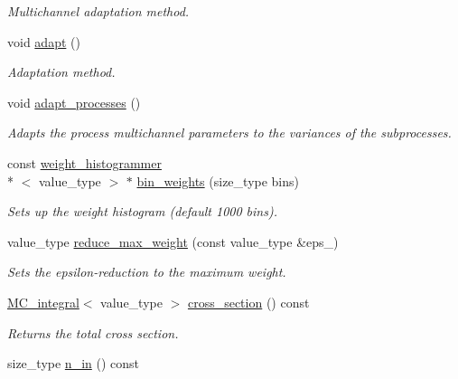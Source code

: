 \begin{DoxyCompactItemize}
\begin{DoxyCompactList}\small\item\em Multichannel adaptation method. \end{DoxyCompactList}\item 
\hypertarget{a00210_a47b3c2a1dd77d0f6537bf973e82ccab6}{void \hyperlink{a00210_a47b3c2a1dd77d0f6537bf973e82ccab6}{adapt} ()}\label{a00210_a47b3c2a1dd77d0f6537bf973e82ccab6}

\begin{DoxyCompactList}\small\item\em Adaptation method. \end{DoxyCompactList}\item 
void \hyperlink{a00210_addbfc929e753761773ff755ed3fff5dc}{adapt\-\_\-processes} ()
\begin{DoxyCompactList}\small\item\em Adapts the process multichannel parameters to the variances of the subprocesses. \end{DoxyCompactList}\item 
\hypertarget{a00210_a8138a6a1c736c588f0b4298e7f118719}{const \hyperlink{a00576}{weight\-\_\-histogrammer}\\*
$<$ value\-\_\-type $>$ $\ast$ \hyperlink{a00210_a8138a6a1c736c588f0b4298e7f118719}{bin\-\_\-weights} (size\-\_\-type bins)}\label{a00210_a8138a6a1c736c588f0b4298e7f118719}

\begin{DoxyCompactList}\small\item\em Sets up the weight histogram (default 1000 bins). \end{DoxyCompactList}\item 
\hypertarget{a00210_a27e2b6a812ca5eee12c60a67a5718020}{value\-\_\-type \hyperlink{a00210_a27e2b6a812ca5eee12c60a67a5718020}{reduce\-\_\-max\-\_\-weight} (const value\-\_\-type \&eps\-\_\-)}\label{a00210_a27e2b6a812ca5eee12c60a67a5718020}

\begin{DoxyCompactList}\small\item\em Sets the epsilon-\/reduction to the maximum weight. \end{DoxyCompactList}\item 
\hypertarget{a00210_ac74de260f019c79f40f7a326bb9854eb}{\hyperlink{a00363}{M\-C\-\_\-integral}$<$ value\-\_\-type $>$ \hyperlink{a00210_ac74de260f019c79f40f7a326bb9854eb}{cross\-\_\-section} () const }\label{a00210_ac74de260f019c79f40f7a326bb9854eb}

\begin{DoxyCompactList}\small\item\em Returns the total cross section. \end{DoxyCompactList}\item 
\hypertarget{a00210_a7a830b9294b63b89c38d9add14b443ff}{size\-\_\-type \hyperlink{a00210_a7a830b9294b63b89c38d9add14b443ff}{n\-\_\-in} () const }\label{a00210_a7a830b9294b63b89c38d9add14b443ff}


\end{DoxyCompactItemize}
